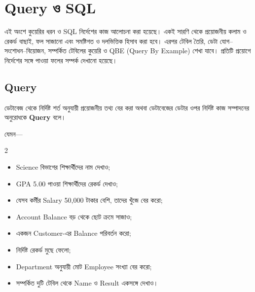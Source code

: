 

\section{Query ও SQL}

\begin{learningbox}
এই অংশে কুয়েরির ধরন ও SQL নির্দেশের কাজ আলোচনা করা হয়েছে। একই সারণি থেকে প্রয়োজনীয় কলাম ও রেকর্ড বাছাই, ফল সাজানো এবং সমষ্টিগত ও দলভিত্তিক হিসাব করা হবে। এরপর টেবিল তৈরি, ডেটা যোগ–সংশোধন–বিয়োজন, সম্পর্কিত টেবিলের কুয়েরি ও QBE (Query By Example) শেখা যাবে। প্রতিটি প্রয়োগে নির্দেশের সঙ্গে পাওয়া ফলের সম্পর্ক দেখানো হয়েছে।
\end{learningbox}

\subsection{Query}

\begin{definitionbox}{}

ডেটাবেজ থেকে নির্দিষ্ট শর্ত অনুযায়ী প্রয়োজনীয় তথ্য বের করা
অথবা ডেটাবেজের ডেটার ওপর নির্দিষ্ট কাজ সম্পাদনের অনুরোধকে
\textbf{Query} বলে।

\end{definitionbox}

যেমন—

\begin{multicols}{2}
\begin{itemize}

\item Science বিভাগের শিক্ষার্থীদের নাম দেখাও;

\item GPA 5.00 পাওয়া শিক্ষার্থীদের রেকর্ড দেখাও;

\item যেসব কর্মীর Salary 50,000 টাকার বেশি, তাদের খুঁজে বের করো;

\item Account Balance বড় থেকে ছোট ক্রমে সাজাও;

\item একজন Customer-এর Balance পরিবর্তন করো;

\item নির্দিষ্ট রেকর্ড মুছে ফেলো;

\item Department অনুযায়ী মোট Employee সংখ্যা বের করো;

\item সম্পর্কিত দুটি টেবিল থেকে Name ও Result একসঙ্গে দেখাও।

\end{itemize}
\end{multicols}

